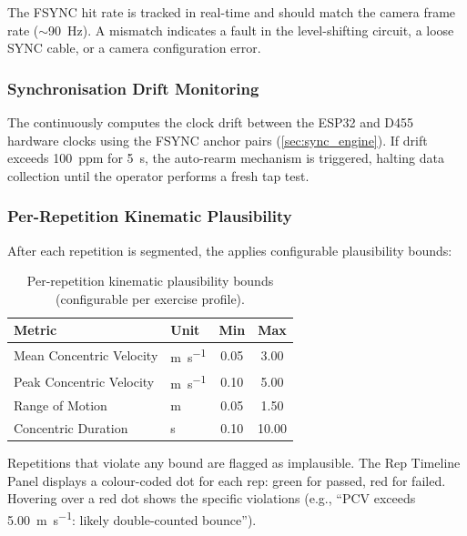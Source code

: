 The FSYNC hit rate is tracked in real-time and should match the camera frame rate ($\sim$\SI{90}{\hertz}).
A mismatch indicates a fault in the level-shifting circuit, a loose SYNC cable, or a camera configuration error.

\subsubsection{Synchronisation Drift Monitoring}

The  continuously computes the clock drift between the ESP32 and D455 hardware clocks using the FSYNC anchor pairs (\cref{sec:sync_engine}).
If drift exceeds \SI{100}{ppm} for \SI{5}{\second}, the auto-rearm mechanism is triggered, halting data collection until the operator performs a fresh tap test.

\subsubsection{Per-Repetition Kinematic Plausibility}

After each repetition is segmented, the  applies configurable plausibility bounds:

\begin{table}[H]
  \centering
  \caption{Per-repetition kinematic plausibility bounds (configurable per exercise profile).}
  \label{tab:plausibility}
  \begin{tabular}{llcc}
    \toprule
    \textbf{Metric} & \textbf{Unit} & \textbf{Min} & \textbf{Max} \\
    \midrule
    Mean Concentric Velocity & \si{\metre\per\second} & 0.05 & 3.00 \\
    Peak Concentric Velocity & \si{\metre\per\second} & 0.10 & 5.00 \\
    Range of Motion          & \si{\metre}            & 0.05 & 1.50 \\
    Concentric Duration      & \si{\second}           & 0.10 & 10.00 \\
    \bottomrule
  \end{tabular}
\end{table}

Repetitions that violate any bound are flagged as implausible.
The Rep Timeline Panel displays a colour-coded dot for each rep: green for passed, red for failed.
Hovering over a red dot shows the specific violations (e.g., ``PCV exceeds \SI{5.00}{\metre\per\second}: likely double-counted bounce'').


